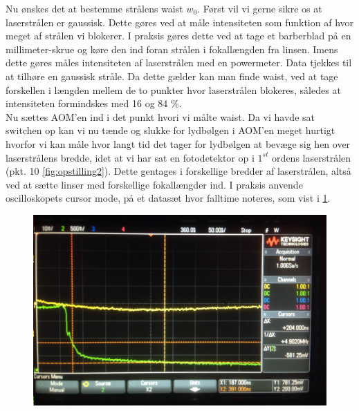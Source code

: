 \documentclass[main]{subfiles}
\begin{document}
Nu ønskes det at bestemme strålens waist $w_0$. Først vil vi gerne sikre os at laserstrålen er gaussisk. Dette gøres ved at måle intensiteten som funktion af hvor meget af strålen vi blokerer. I praksis gøres dette ved at tage et barberblad på en millimeter-skrue og køre den ind foran strålen i fokallængden fra linsen. Imens dette gøres måles intensiteten af laserstrålen med en powermeter. Data tjekkes til at tilhøre en gaussisk stråle. Da dette gælder kan man finde waist, ved at tage forskellen i længden mellem de to punkter hvor laserstrålen blokeres, således at  intensiteten formindskes med 16 og 84 \%.
\\ Nu sættes AOM'en ind i det punkt hvori vi målte waist. Da vi havde sat switchen op kan vi nu tænde og slukke for lydbølgen i AOM'en meget hurtigt hvorfor vi kan måle hvor langt tid det tager for lydbølgen at bevæge sig hen over laserstrålens bredde, idet at vi har sat en fotodetektor op i $1^{st}$ ordens laserstrålen (pkt. 10 \cref{fig:opstilling2}). Dette gentages i forskellige bredder af laserstrålen, altså ved at sætte linser med forskellige fokallængder ind. I praksis anvende oscilloskopets cursor mode, på et datasæt hvor falltime noteres, som vist i  \cref{fig:osciolo}.
\begin{figure}[H]
    \includegraphics[width=\linewidth]{tegninger/osciolo.png}
    \caption{}
    \label{fig:osciolo}
\end{figure}
\end{document}
